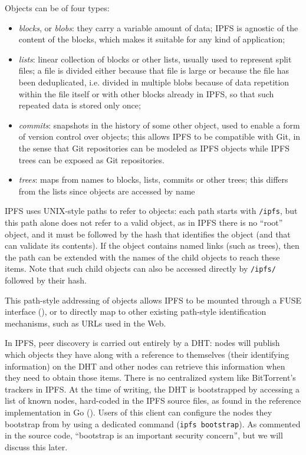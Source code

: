 \documentclass[mscthesis]{usiinfthesis}
\begin{document}
Objects can be of four types:
\begin{itemize}
	\item \emph{blocks}, or \textit{blobs}: they carry a variable amount of data; IPFS is agnostic of the content of the blocks, which makes it suitable for any kind of application;
	\item \emph{lists}: linear collection of blocks or other lists, usually used to represent split files; a file is divided either because that file is large or because the file has been deduplicated, i.e. divided in multiple blobs because of data repetition within the file itself or with other blocks already in IPFS, so that such repeated data is stored only once;
	\item \emph{commits}: snapshots in the history of some other object, used to enable a form of version control over objects; this allows IPFS to be compatible with Git, in the sense that Git repositories can be modeled as IPFS objects while IPFS trees can be exposed as Git repositories.
	\item \emph{trees}: maps from names to blocks, lists, commits or other trees; this differs from the lists since objects are accessed by name
\end{itemize}

IPFS uses UNIX-style paths to refer to objects: each path starts with \texttt{/ipfs}, but this path alone does not refer to a valid object, as in IPFS there is no ``root'' object, and it must be followed by the hash that identifies the object (and that can validate its contents). If the object contains named links (such as trees), then the path can be extended with the names of the child objects to reach these items. Note that such child objects can also be accessed directly by \texttt{/ipfs/} followed by their hash.

This path-style addressing of objects allows IPFS to be mounted through a FUSE interface (\cite{website:fusegithub}), or to directly map to other existing path-style identification mechanisms, such as URLs used in the Web.

In IPFS, peer discovery is carried out entirely by a DHT: nodes will publish which objects they have along with a reference to themselves (their identifying information) on the DHT and other nodes can retrieve this information when they need to obtain those items. There is no centralized system like BitTorrent's trackers in IPFS.
At the time of writing, the DHT is bootstrapped by accessing a list of known nodes, hard-coded in the IPFS source files, as found in the reference implementation in Go (\cite{website:ipfsbootstrapsourcefile}). Users of this client can configure the nodes they bootstrap from by using a dedicated command (\texttt{ipfs bootstrap}). As commented in the source code, ``bootstrap is an important security concern'', but we will discuss this later.
\end{document}
